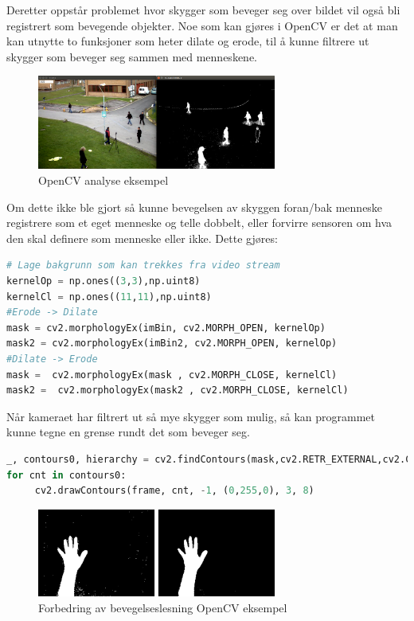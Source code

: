 \documentclass{article}
\begin{document}
Deretter oppstår problemet hvor skygger som beveger seg over bildet vil også bli registrert som bevegende objekter. Noe som kan gjøres i OpenCV er det at man kan utnytte to funksjoner som heter dilate og erode\cite{opencvdos}, til å kunne filtrere ut skygger som beveger seg sammen med menneskene. 
\begin{figure}[!ht]
  \centering
      \includegraphics[width=0.7\textwidth]{opencvBackgroundSubtraction}
  \caption{OpenCV analyse eksempel}
\end{figure}
Om dette ikke ble gjort så kunne bevegelsen av skyggen foran/bak menneske registrere som et eget menneske og telle dobbelt, eller forvirre sensoren om hva den skal definere som menneske eller ikke. Dette gjøres:

\begin{lstlisting}[language=Python, caption=OpenCV 3]
# Lage bakgrunn som kan trekkes fra video stream
kernelOp = np.ones((3,3),np.uint8)
kernelCl = np.ones((11,11),np.uint8)
#Erode -> Dilate
mask = cv2.morphologyEx(imBin, cv2.MORPH_OPEN, kernelOp)
mask2 = cv2.morphologyEx(imBin2, cv2.MORPH_OPEN, kernelOp)
#Dilate -> Erode
mask =  cv2.morphologyEx(mask , cv2.MORPH_CLOSE, kernelCl)
mask2 =  cv2.morphologyEx(mask2 , cv2.MORPH_CLOSE, kernelCl)
\end{lstlisting}

Når kameraet har filtrert ut så mye skygger som mulig, så kan programmet kunne tegne en grense rundt det som beveger seg.

\begin{lstlisting}[language=Python, caption=OpenCV 4]
_, contours0, hierarchy = cv2.findContours(mask,cv2.RETR_EXTERNAL,cv2.CHAIN_APPROX_NONE)
for cnt in contours0:
   	 cv2.drawContours(frame, cnt, -1, (0,255,0), 3, 8)
\end{lstlisting}

\begin{figure}[!ht]
  \centering
      \includegraphics[width=0.7\textwidth]{dilationErosion}
  \caption{Forbedring av bevegelseslesning OpenCV eksempel}
\end{figure}
\end{document}
